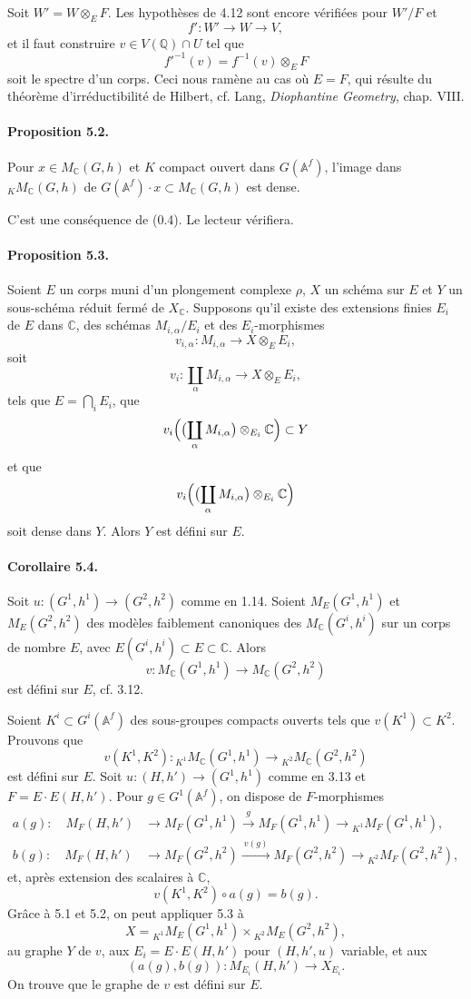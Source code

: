 \documentclass[10pt]{article}
\newcommand{\Af}{\mathbb A^f}
\newcommand{\C}{\mathbb C}
\newcommand{\Q}{\mathbb Q}
\newcommand{\MC}{M_{\C}}
\begin{document}
Soit $W'=W\otimes_EF$. Les hypothèses de 4.12 sont encore vérifiées pour $W'/F$ et
\[
f':W'\longrightarrow W\longrightarrow V,
\]
et il faut construire $v\in V(\Q)\cap U$ tel que
\[
f'^{-1}(v)=f^{-1}(v)\otimes_EF
\]
soit le spectre d'un corps. Ceci nous ramène au cas où $E=F$, qui résulte du théorème d'irréductibilité de Hilbert, cf. Lang, \emph{Diophantine Geometry}, chap. VIII.

\paragraph{Proposition 5.2.} Pour $x\in\MC(G,h)$ et $K$ compact ouvert dans $G(\Af)$, l'image dans ${}_K\MC(G,h)$ de $G(\Af)\cdot x\subset\MC(G,h)$ est dense.

C'est une conséquence de (0.4). Le lecteur vérifiera.

\paragraph{Proposition 5.3.} Soient $E$ un corps muni d'un plongement complexe $\rho$, $X$ un schéma sur $E$ et $Y$ un sous-schéma réduit fermé de $X_{\C}$. Supposons qu'il existe des extensions finies $E_i$ de $E$ dans $\C$, des schémas $M_{i,\alpha}/E_i$ et des $E_i$-morphismes
\[
v_{i,\alpha}:M_{i,\alpha}\longrightarrow X\otimes_EE_i,
\]
soit
\[
v_i:\coprod_\alpha M_{i,\alpha}\longrightarrow X\otimes_EE_i,
\]
tels que $E=\bigcap_i E_i$, que
\[
v_i\Bigl(\bigl(\coprod_\alpha M_{i,\alpha}\bigr)\otimes_{E_i}\C\Bigr)\subset Y
\]
et que
\[
v_i\Bigl(\bigl(\coprod_\alpha M_{i,\alpha}\bigr)\otimes_{E_i}\C\Bigr)
\]
soit dense dans $Y$. Alors $Y$ est défini sur $E$.

\paragraph{Corollaire 5.4.} Soit $u:(G^1,h^1)\to(G^2,h^2)$ comme en 1.14. Soient $M_E(G^1,h^1)$ et $M_E(G^2,h^2)$ des modèles faiblement canoniques des $\MC(G^i,h^i)$ sur un corps de nombre $E$, avec $E(G^i,h^i)\subset E\subset\C$. Alors
\[
v:\MC(G^1,h^1)\longrightarrow\MC(G^2,h^2)
\]
est défini sur $E$, cf. 3.12.

Soient $K^i\subset G^i(\Af)$ des sous-groupes compacts ouverts tels que $v(K^1)\subset K^2$. Prouvons que
\[
v(K^1,K^2):{}_{K^1}\MC(G^1,h^1)\longrightarrow{}_{K^2}\MC(G^2,h^2)
\]
est défini sur $E$. Soit $u:(H,h')\to(G^1,h^1)$ comme en 3.13 et $F=E\cdot E(H,h')$. Pour $g\in G^1(\Af)$, on dispose de $F$-morphismes
\[
\begin{aligned}
a(g):\quad M_F(H,h')&\longrightarrow M_F(G^1,h^1)
 \xrightarrow{\ g\ } M_F(G^1,h^1)
 \longrightarrow {}_{K^1}M_F(G^1,h^1),\\
b(g):\quad M_F(H,h')&\longrightarrow M_F(G^2,h^2)
 \xrightarrow{\ v(g)\ } M_F(G^2,h^2)
 \longrightarrow {}_{K^2}M_F(G^2,h^2),
\end{aligned}
\]
et, après extension des scalaires à $\C$,
\[
v(K^1,K^2)\circ a(g)=b(g).
\]
Grâce à 5.1 et 5.2, on peut appliquer 5.3 à
\[
X={}_{K^1}M_E(G^1,h^1)\times{}_{K^2}M_E(G^2,h^2),
\]
au graphe $Y$ de $v$, aux $E_i=E\cdot E(H,h')$ pour $(H,h',u)$ variable, et aux
\[
(a(g),b(g)):M_{E_i}(H,h')\longrightarrow X_{E_i}.
\]
On trouve que le graphe de $v$ est défini sur $E$.
\end{document}
